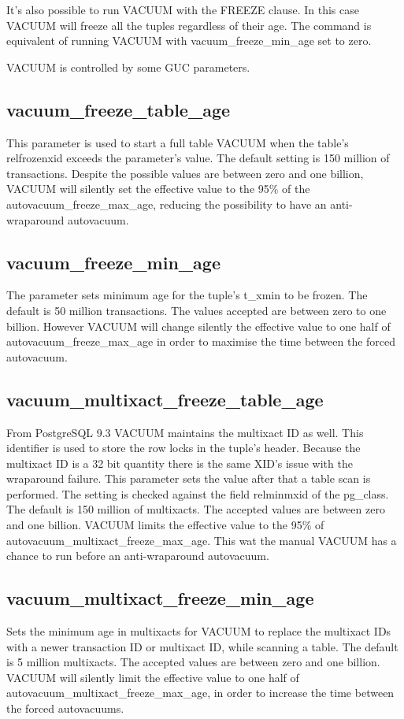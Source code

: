 It's also possible to run VACUUM with the FREEZE  clause. In this case VACUUM 
will freeze all the tuples regardless of their age. The command is equivalent of running VACUUM with 
vacuum\_freeze\_min\_age set to zero.\newline

VACUUM is controlled by some GUC parameters.

\subsection{vacuum\_freeze\_table\_age}
This parameter is used to start a full table VACUUM when the table's relfrozenxid exceeds the parameter's 
value. The default setting is 150 million of transactions. Despite the possible values are between zero 
and one billion, VACUUM will silently set the effective value to the 95\% of 
the autovacuum\_freeze\_max\_age, reducing the possibility to have an anti-wraparound autovacuum.

\subsection{vacuum\_freeze\_min\_age}
The parameter sets minimum age for the tuple's t\_xmin to be frozen. The default is 50 million 
transactions. The values accepted are between zero to one billion. However VACUUM will change silently the 
effective value to one half of autovacuum\_freeze\_max\_age in order to maximise the time between the 
forced autovacuum.

\subsection{vacuum\_multixact\_freeze\_table\_age}
From PostgreSQL 9.3 VACUUM maintains the multixact ID as well. This identifier is used to store the 
row locks in the tuple's header.  Because the multixact ID is a 32 bit quantity there 
is the same XID's issue with the wraparound failure. This parameter 
sets the value after that a table scan is performed. The setting is checked against the field relminmxid of 
the pg\_class. The default is 150 million of multixacts. The accepted values are between zero and one 
billion. VACUUM limits the effective value to the 95\% of autovacuum\_multixact\_freeze\_max\_age. This wat 
the manual VACUUM has a chance to run before an anti-wraparound autovacuum.

\subsection{vacuum\_multixact\_freeze\_min\_age}
Sets the minimum age in multixacts for VACUUM to replace the multixact IDs with a newer transaction ID or 
multixact ID, while scanning a table. The default is 5 million multixacts. The accepted values 
are between zero and one billion. VACUUM will silently limit the effective value to one half of 
autovacuum\_multixact\_freeze\_max\_age, in order to increase the time between the forced autovacuums.

